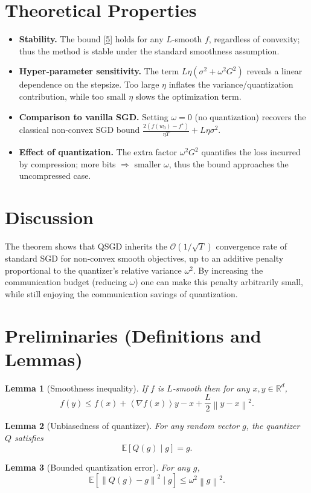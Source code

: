 \documentclass{article}
\newtheorem{lemma}{Lemma}
\newcommand{\E}{\mathbb{E}}
\newcommand{\R}{\mathbb{R}}
\newcommand{\norm}[1]{\left\lVert#1\right\rVert}
\newcommand{\inner}[1]{\left\langle#1\right\rangle}
\begin{document}
\section*{Theoretical Properties}
\begin{itemize}
\item \textbf{Stability.} The bound \eqref{5} holds for any $L$‑smooth $f$, regardless of convexity; thus the method is stable under the standard smoothness assumption.
\item \textbf{Hyper‑parameter sensitivity.} The term $L\eta(\sigma^{2}+\omega^{2}G^{2})$ reveals a linear dependence on the stepsize. Too large $\eta$ inflates the variance/quantization contribution, while too small $\eta$ slows the optimization term.
\item \textbf{Comparison to vanilla SGD.} Setting $\omega=0$ (no quantization) recovers the classical non‑convex SGD bound $\frac{2(f(w_{0})-f^{\star})}{\eta T}+L\eta\sigma^{2}$.
\item \textbf{Effect of quantization.} The extra factor $\omega^{2}G^{2}$ quantifies the loss incurred by compression; more bits $\Rightarrow$ smaller $\omega$, thus the bound approaches the uncompressed case.
\end{itemize}

\section*{Discussion}
The theorem shows that QSGD inherits the $\mathcal{O}(1/\sqrt{T})$ convergence rate of standard SGD for non‑convex smooth objectives, up to an additive penalty proportional to the quantizer’s relative variance $\omega^{2}$. By increasing the communication budget (reducing $\omega$) one can make this penalty arbitrarily small, while still enjoying the communication savings of quantization.

\newpage
\section*{Preliminaries (Definitions and Lemmas)}
\begin{lemma}[Smoothness inequality]\label{lem:smooth}
If $f$ is $L$‑smooth then for any $x,y\in\R^{d}$,
\[
f(y)\le f(x)+\inner{\nabla f(x)}{y-x}+\frac{L}{2}\norm{y-x}^{2}.
\]
\end{lemma}
\begin{lemma}[Unbiasedness of quantizer]\label{lem:unbiased}
For any random vector $g$, the quantizer $Q$ satisfies
\[
\E[Q(g)\mid g]=g.
\]
\end{lemma}
\begin{lemma}[Bounded quantization error]\label{lem:quantvar}
For any $g$,
\[
\E\!\left[\norm{Q(g)-g}^{2}\mid g\right]\le\omega^{2}\norm{g}^{2}.
\]
\end{lemma}
\end{document}

